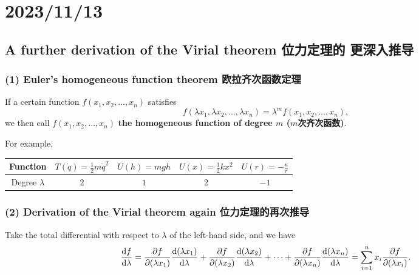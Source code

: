 \chapter{2023/11/13}\label{20231113}

\section{A further derivation of the Virial theorem 位力定理的
更深入推导}\label{a-further-ux66f4ux6df1ux5165ux63a8ux5bfc}

\subsection*{(1) Euler's homogeneous function theorem
欧拉齐次函数定理}\label{eulers-homogeneous-function-theorem-ux6b27ux62c9ux9f50ux6b21ux51fdux6570ux5b9aux7406}

If a certain function \(f(x_1, x_2, \dots, x_n)\) satisfies
\[f(\lambda x_1, \lambda x_2, \dots, \lambda x_n) = \lambda ^m f(x_1, x_2, \dots, x_n),\]
we then call \(f(x_1, x_2, \dots, x_n)\) \textbf{the homogeneous
function of degree \(m\) (\(m\)次齐次函数)}.

For example,

\begin{center}
    \begin{tabular}{|c|c|c|c|c|}
        \hline
        Function & $T(\dot q) = \frac{1}{2} m \dot q^2$ & $U(h) = mgh$ & $U(x) = \frac{1}{2} kx^2$ & $U(r) = -\frac{\kappa}{r}$ \\
        \hline
        Degree $\lambda$ & $2$ & $1$ & $2$ & $-1$ \\
        \hline
    \end{tabular}
\end{center}

\subsection*{(2) Derivation of the Virial theorem again
位力定理的再次推导}\label{derivation-of-the-virial-theorem-again-ux4f4dux529bux5b9aux7406ux7684ux518dux6b21ux63a8ux5bfc}

Take the total differential with respect to \(\lambda\) of the left-hand
side, and we have
\[{\mathrm df \over \mathrm d \lambda} = {\partial f \over \partial (\lambda x_1)} {\mathrm d (\lambda x_1) \over \mathrm d \lambda} + {\partial f \over \partial (\lambda x_2)} {\mathrm d (\lambda x_2) \over \mathrm d \lambda} + \cdots + {\partial f \over \partial (\lambda x_n)} {\mathrm d (\lambda x_n) \over \mathrm d \lambda} = \sum _{i=1}^n x_i {\partial f \over \partial (\lambda x_i)}.\]

